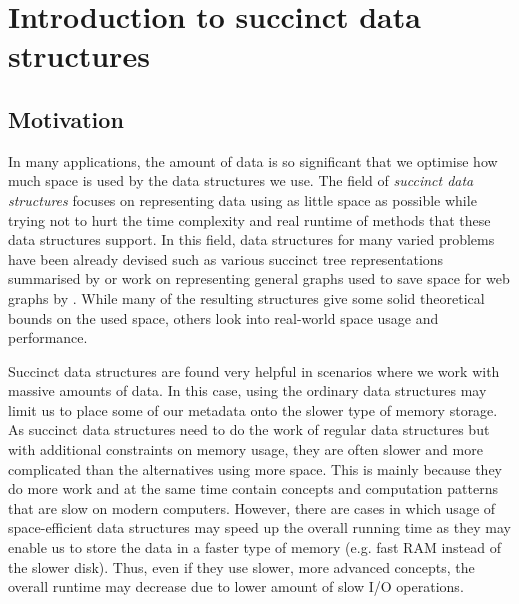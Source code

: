 \chapter{Introduction to succinct data structures}
\label{kap:kap1}

\section{Motivation}

In many applications, the amount of data is so significant that we optimise how much
space is used by the data structures we use. The field of \textit{succinct data structures}
focuses on representing data using as little space as possible while trying not to hurt
the time complexity and real runtime of methods that these data structures support. In
this field, data structures for many varied problems have been already devised such as
various succinct tree representations summarised by \cite{raman2013succinct} or work
on representing general graphs used to save space for web graphs by \cite{claude2010extended}. 
While many of the resulting structures give some solid theoretical bounds on the used space,
others look into real-world space usage and performance.

Succinct data structures are found very helpful in scenarios where we work with massive
amounts of data. In this case, using the ordinary data structures may limit us to place
some of our metadata onto the slower type of memory storage. As succinct data structures
need to do the work of regular data structures but with additional constraints on memory
usage, they are often slower and more complicated than the alternatives using more space.
This is mainly because they do more work and at the same time contain concepts and computation
patterns that are slow on modern computers. However, there are cases in which usage of
space-efficient data structures may speed up the overall running time as they may enable us
to store the data in a faster type of memory (e.g. fast RAM instead of the slower disk).
Thus, even if they use slower, more advanced concepts, the overall runtime may decrease
due to lower amount of slow I/O operations.


